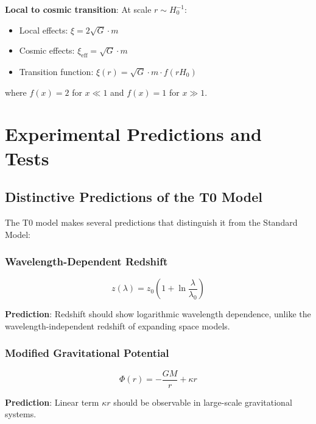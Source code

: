 \documentclass[12pt,a4paper]{article}
\begin{document}
	\textbf{Local to cosmic transition}: At scale $r \sim H_0^{-1}$:
	\begin{itemize}
		\item Local effects: $\xi = 2\sqrt{G} \cdot m$
		\item Cosmic effects: $\xi_{\text{eff}} = \sqrt{G} \cdot m$
		\item Transition function: $\xi(r) = \sqrt{G} \cdot m \cdot f(r H_0)$
	\end{itemize}
	
	where $f(x) = 2$ for $x \ll 1$ and $f(x) = 1$ for $x \gg 1$.
	
	\section{Experimental Predictions and Tests}
	\label{sec:experimental_predictions}
	
	\subsection{Distinctive Predictions of the T0 Model}
	\label{subsec:distinctive_predictions}
	
	The T0 model makes several predictions that distinguish it from the Standard Model:
	
	\subsubsection{Wavelength-Dependent Redshift}
	\label{subsubsec:wavelength_redshift}
	
	\begin{equation}
		\boxed{z(\lambda) = z_0\left(1 + \ln\frac{\lambda}{\lambda_0}\right)}
	\end{equation}
	
	\textbf{Prediction}: Redshift should show logarithmic wavelength dependence, unlike the wavelength-independent redshift of expanding space models.
	
	\subsubsection{Modified Gravitational Potential}
	\label{subsubsec:modified_potential}
	
	\begin{equation}
		\Phi(r) = -\frac{GM}{r} + \kappa r
	\end{equation}
	
	\textbf{Prediction}: Linear term $\kappa r$ should be observable in large-scale gravitational systems.
	
\end{document}
